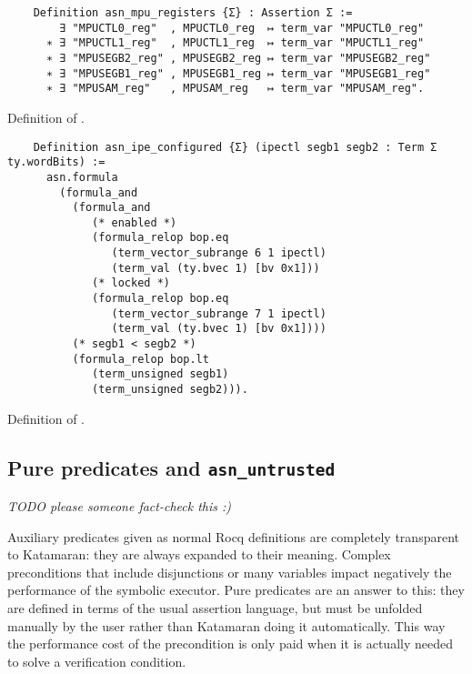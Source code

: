 \begin{listing}
  \begin{verbatim}
    Definition asn_mpu_registers {Σ} : Assertion Σ :=
        ∃ "MPUCTL0_reg"  , MPUCTL0_reg  ↦ term_var "MPUCTL0_reg"
      ∗ ∃ "MPUCTL1_reg"  , MPUCTL1_reg  ↦ term_var "MPUCTL1_reg"
      ∗ ∃ "MPUSEGB2_reg" , MPUSEGB2_reg ↦ term_var "MPUSEGB2_reg"
      ∗ ∃ "MPUSEGB1_reg" , MPUSEGB1_reg ↦ term_var "MPUSEGB1_reg"
      ∗ ∃ "MPUSAM_reg"   , MPUSAM_reg   ↦ term_var "MPUSAM_reg".
  \end{verbatim}
  \caption{Definition of .}
  \label{lst:asn_mpu_registers}
\end{listing}

\begin{listing}
  \begin{verbatim}
    Definition asn_ipe_configured {Σ} (ipectl segb1 segb2 : Term Σ ty.wordBits) :=
      asn.formula
        (formula_and
          (formula_and
             (* enabled *)
             (formula_relop bop.eq
                (term_vector_subrange 6 1 ipectl)
                (term_val (ty.bvec 1) [bv 0x1]))
             (* locked *)
             (formula_relop bop.eq
                (term_vector_subrange 7 1 ipectl)
                (term_val (ty.bvec 1) [bv 0x1])))
          (* segb1 < segb2 *)
          (formula_relop bop.lt
             (term_unsigned segb1)
             (term_unsigned segb2))).
  \end{verbatim}
  \caption{Definition of .}
  \label{lst:asn_ipe_configured}
\end{listing}

\subsection{Pure predicates and \texttt{asn\_untrusted}}

\emph{TODO please someone fact-check this :)}

Auxiliary predicates given as normal Rocq definitions are completely transparent to Katamaran: they are always expanded to their meaning. Complex preconditions that include disjunctions or many variables impact negatively the performance of the symbolic executor. Pure predicates are an answer to this: they are defined in terms of the usual assertion language, but must be unfolded manually by the user rather than Katamaran doing it automatically. This way the performance cost of the precondition is only paid when it is actually needed to solve a verification condition.

